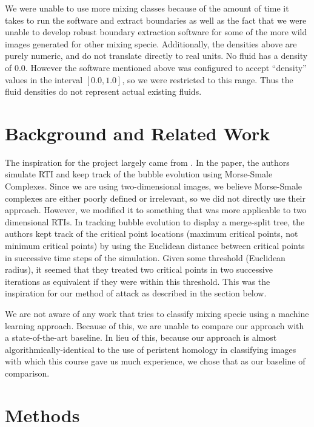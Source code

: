 \documentclass[12pt, fullpage,letterpaper]{article}
\theoremstyle{definition}
\begin{document}
	We were unable to use more mixing classes because of the amount of time it takes to run the software and extract boundaries as well as the fact that we were unable to develop robust boundary extraction software for some of the more wild images generated for other mixing specie. Additionally, the densities above are purely numeric, and do not translate directly to real units. No fluid has a density of 0.0. However the software mentioned above was configured to accept ``density'' values in the interval $[0.0, 1.0]$, so we were restricted to this range. Thus the fluid densities do not represent actual existing fluids. %
	
	\section*{\normalfont Background and Related Work}
	The inspiration for the project largely came from \cite{paper}. In the paper, the authors simulate RTI and keep track of the bubble evolution using Morse-Smale Complexes. Since we are using two-dimensional images, we believe Morse-Smale complexes are either poorly defined or irrelevant, so we did not directly use their approach. However, we modified it to something that was more applicable to two dimensional RTIs. In tracking bubble evolution to display a merge-split tree, the authors kept track of the critical point locations (maximum critical points, not minimum critical points) by using the Euclidean distance between critical points in successive time steps of the simulation. Given some threshold (Euclidean radius), it seemed that they treated two critical points in two successive iterations as equivalent if they were within this threshold. This was the inspiration for our method of attack as described in the section below. 
	
	We are not aware of any work that tries to classify mixing specie using a machine learning approach. Because of this, we are unable to compare our approach with a state-of-the-art baseline. In lieu of this, because our approach is almost algorithmically-identical to the use of peristent homology in classifying images with which this course gave us much experience, we chose that as our baseline of comparison.
	
	\section*{\normalfont Methods}
\end{document}
